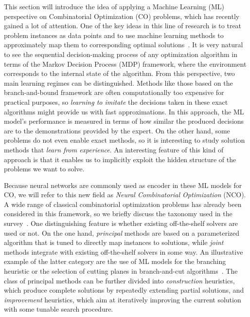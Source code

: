 \documentclass[a4paper]{article}
\theoremstyle{definition}
\theoremstyle{plain}
\begin{document}
This section will introduce the idea of applying a Machine Learning (ML) perspective
on Combinatorial Optimization (CO) problems, which has recently gained a lot of
attention. One of the key ideas in this line of research is to treat problem
instances as data points and to use machine learning methods to approximately
map them to corresponding optimal
solutions~\cite{bengioMachineLearningCombinatorial2020}.
It is very natural to see the sequential decision-making process of any
optimization algorithm in terms of the Markov Decision Process (MDP) framework,
where the environment corresponds to the internal state of the algorithm. From
this perspective, two main learning regimes can be distinguished.
Methods like those based on the branch-and-bound framework are
often computationally too expensive for practical purposes, so \textit{learning
  to imitate} the decisions taken in these exact algorithms might provide us
with fast approximations. In this approach, the ML model's performance is
measured in terms of how similar the produced decisions are to the
demonstrations provided by the expert.
On the other hand, some problems do not even enable exact methods, so it is
interesting to study solution methods that \textit{learn from experience}. An
interesting feature of this kind of approach is that it enables us to implicitly
exploit the hidden structure of the problems we want to solve.

Because neural networks are commonly used as encoder in these ML models for CO,
we will refer to this new field as \textit{Neural Combinatorial Optimization} (NCO).
%
A wide range of classical combinatorial optimization problems has already been
considered in this framework, so we briefly discuss the taxonomy used in the
survey~\cite{mazyavkinaReinforcementLearningCombinatorial2020}.
One distinguishing feature is whether existing off-the-shelf solvers are used or
not. On the one hand, \textit{principal} methods are based on a parameterized
algorithm that is tuned to directly map instances to solutions, while
\textit{joint} methods integrate with existing off-the-shelf solvers in some
way. An illustrative example of the latter category are the use of ML models for
the branching heuristic or the selection of cutting planes in branch-and-cut
algorithms~\cite{tangReinforcementLearningInteger2020}.
The class of principal methods can be further divided into \textit{construction}
heuristics, which produce complete solutions by repeatedly extending partial
solutions, and \textit{improvement} heuristics, which aim at iteratively improving the
current solution with some tunable search procedure.
\end{document}
